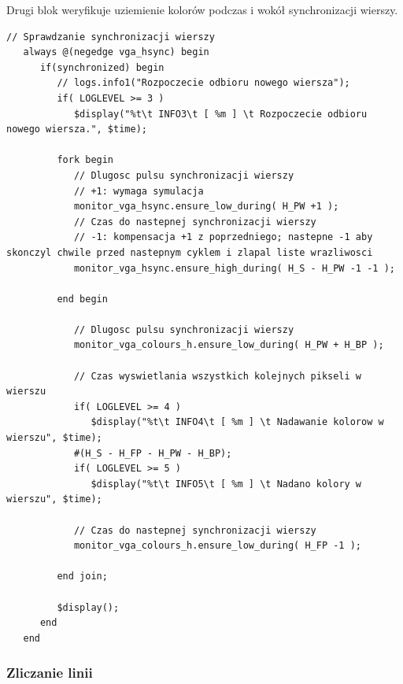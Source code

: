 \documentclass[a4paper,12pt]{article}
\begin{document}
Drugi blok weryfikuje uziemienie kolorów podczas i wokół synchronizacji wierszy.
\begin{lstlisting}[label=Vga_Behav_Sync,caption=Vga\_Behav\_Synv.v,firstnumber=105]
   // Sprawdzanie synchronizacji wierszy
   always @(negedge vga_hsync) begin
      if(synchronized) begin
         // logs.info1("Rozpoczecie odbioru nowego wiersza");
         if( LOGLEVEL >= 3 )
            $display("%t\t INFO3\t [ %m ] \t Rozpoczecie odbioru nowego wiersza.", $time);

         fork begin
            // Dlugosc pulsu synchronizacji wierszy
            // +1: wymaga symulacja
            monitor_vga_hsync.ensure_low_during( H_PW +1 );
            // Czas do nastepnej synchronizacji wierszy
            // -1: kompensacja +1 z poprzedniego; nastepne -1 aby skonczyl chwile przed nastepnym cyklem i zlapal liste wrazliwosci
            monitor_vga_hsync.ensure_high_during( H_S - H_PW -1 -1 );

         end begin

            // Dlugosc pulsu synchronizacji wierszy
            monitor_vga_colours_h.ensure_low_during( H_PW + H_BP );

            // Czas wyswietlania wszystkich kolejnych pikseli w wierszu
            if( LOGLEVEL >= 4 )
               $display("%t\t INFO4\t [ %m ] \t Nadawanie kolorow w wierszu", $time);
            #(H_S - H_FP - H_PW - H_BP);
            if( LOGLEVEL >= 5 )
               $display("%t\t INFO5\t [ %m ] \t Nadano kolory w wierszu", $time);

            // Czas do nastepnej synchronizacji wierszy
            monitor_vga_colours_h.ensure_low_during( H_FP -1 );

         end join;

         $display();
      end
   end
\end{lstlisting}


\subsubsection{Zliczanie linii}
\end{document}
